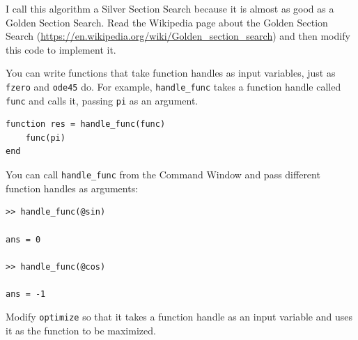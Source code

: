 \documentclass[
]{book}
\begin{document}
\begin{ex}
I call this algorithm a Silver Section Search because it is almost as
good as a Golden Section Search.  Read the Wikipedia page about the
Golden Section Search
(\url{https://en.wikipedia.org/wiki/Golden_section_search}) and then
modify this code to implement it.
\end{ex}

\begin{ex}
You can write functions that take function handles as input
variables, just as {\tt fzero} and {\tt ode45} do.
For example, {\tt handle\_func} takes a function handle called
{\tt func} and calls it, passing {\tt pi} as an argument.

\begin{verbatim}
function res = handle_func(func)
    func(pi)
end
\end{verbatim}

You can call {\tt handle\_func} from the Command Window and pass
different function handles as arguments:

\begin{verbatim}
>> handle_func(@sin)

ans = 0

>> handle_func(@cos)

ans = -1
\end{verbatim}

Modify {\tt optimize} so that it takes a function handle
as an input variable and uses it as the function to be
maximized.
\end{ex}
\end{document}
